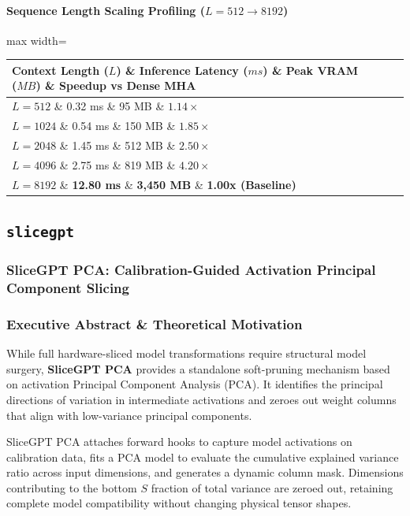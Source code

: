 \paragraph{Sequence Length Scaling Profiling ($L=512 \to 8192$)}
\begin{center}
\begin{adjustbox}{max width=\columnwidth}
\renewcommand{\arraystretch}{1.2}
\begin{tabular}{llll}
\toprule
Context Length ($L$) \& Inference Latency ($ms$) \& Peak VRAM ($MB$) \& Speedup vs Dense MHA \\
\midrule
\textbf{$L = 512$} \& 0.32 ms \& 95 MB \& $1.14\times$ \\
\textbf{$L = 1024$} \& 0.54 ms \& 150 MB \& $1.85\times$ \\
\textbf{$L = 2048$} \& 1.45 ms \& 512 MB \& $2.50\times$ \\
\textbf{$L = 4096$} \& 2.75 ms \& 819 MB \& $4.20\times$ \\
\textbf{$L = 8192$} \& \textbf{12.80 ms} \& \textbf{3,450 MB} \& \textbf{1.00x (Baseline)} \\


\bottomrule
\end{tabular}
\end{adjustbox}
\end{center}

\subsection{\texttt{slicegpt}}
\subsubsection*{SliceGPT PCA: Calibration-Guided Activation Principal Component Slicing}

\subsubsection*{Executive Abstract \& Theoretical Motivation}

While full hardware-sliced model transformations require structural model surgery, \textbf{SliceGPT PCA} provides a standalone soft-pruning mechanism based on activation Principal Component Analysis (PCA). It identifies the principal directions of variation in intermediate activations and zeroes out weight columns that align with low-variance principal components.

SliceGPT PCA attaches forward hooks to capture model activations on calibration data, fits a PCA model to evaluate the cumulative explained variance ratio across input dimensions, and generates a dynamic column mask. Dimensions contributing to the bottom $S$ fraction of total variance are zeroed out, retaining complete model compatibility without changing physical tensor shapes.

